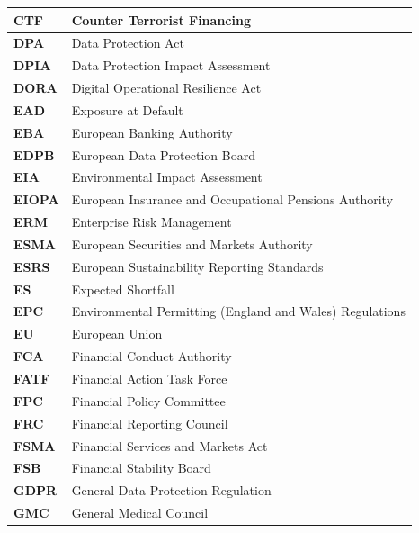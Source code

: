 \begin{longtable}{ | >{\raggedright\arraybackslash}p{} 
                  | >{\raggedright\arraybackslash}p{} | }
        \hline
        \textbf{CTF} & Counter Terrorist Financing \\
        \hline
        \textbf{DPA} & Data Protection Act \\
        \hline
        \textbf{DPIA} & Data Protection Impact Assessment \\
        \hline
        \textbf{DORA} & Digital Operational Resilience Act \\
        \hline
        \textbf{EAD} & Exposure at Default \\
        \hline
        \textbf{EBA} & European Banking Authority \\
        \hline
        \textbf{EDPB} & European Data Protection Board \\
        \hline
        \textbf{EIA} & Environmental Impact Assessment \\
        \hline
        \textbf{EIOPA} & European Insurance and Occupational Pensions Authority \\
        \hline
        \textbf{ERM} & Enterprise Risk Management \\
        \hline
        \textbf{ESMA} & European Securities and Markets Authority \\
        \hline
        \textbf{ESRS} & European Sustainability Reporting Standards \\
        \hline
        \textbf{ES} & Expected Shortfall \\
        \hline
        \textbf{EPC} & Environmental Permitting (England and Wales) Regulations \\
        \hline
        \textbf{EU} & European Union \\
        \hline
        \textbf{FCA} & Financial Conduct Authority \\
        \hline
        \textbf{FATF} & Financial Action Task Force \\
        \hline
        \textbf{FPC} & Financial Policy Committee \\
        \hline
        \textbf{FRC} & Financial Reporting Council \\
        \hline
        \textbf{FSMA} & Financial Services and Markets Act \\
        \hline
        \textbf{FSB} & Financial Stability Board \\
        \hline
        \textbf{GDPR} & General Data Protection Regulation \\
        \hline
        \textbf{GMC} & General Medical Council \\
        \hline

\end{longtable}
